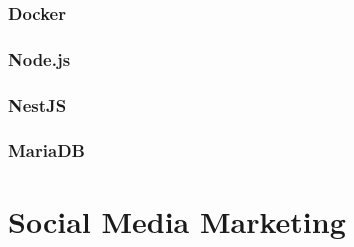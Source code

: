 \subsubsection*{Docker}

\subsubsection*{Node.js}

\subsubsection*{NestJS}

\subsubsection*{MariaDB}

\section{Social Media Marketing}

